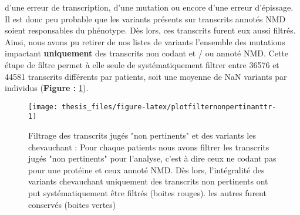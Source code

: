 \documentclass[12pt,twoside]{reedthesis}
\theoremstyle{definition}
\theoremstyle{definition}
\theoremstyle{remark}
\begin{document}
\begin{enumerate}
    d'une erreur de transcription, d'une mutation ou encore d'une erreur
    d'épissage. Il est donc peu probable que les variants présents sur
    transcrits annotés NMD soient responsables du phénotype. Dès lors, ces
    transcrits furent eux aussi filtrés. Ainsi, nous avons pu retirer de
    nos listes de variants l'ensemble des mutations impactant
    \textbf{uniquement} des transcrits non codant et / ou annoté NMD.
    Cette étape de filtre permet à elle seule de systématiquement filtrer
    entre 36576 et 44581 transcrits différents par patients, soit une
    moyenne de NaN variants par individus (\textbf{Figure :
    }\ref{fig:plotfilternonpertinanttr}).
  \end{enumerate}
  
  \begin{figure}
  
  {\centering \texttt{[image: thesis\_files/figure-latex/plotfilternonpertinanttr-1]} 
  
  }
  
  \caption[Filtrage des transcrits jugés "non pertinents" et des variants les chevauchant]{Filtrage des transcrits jugés "non pertinents" et des variants les chevauchant : Pour chaque patients nous avons filtrer les transcrits jugés "non pertinents" pour l'analyse, c'est à dire ceux ne codant pas pour une protéine et ceux annoté NMD. Dès lors, l'intégralité des variants chevauchant uniquement des transcrits non pertinents ont put systématiquement être filtrés (boites rouges). les autres furent conservés (boites vertes)}\label{fig:plotfilternonpertinanttr}
  \end{figure}
  
\end{document}

